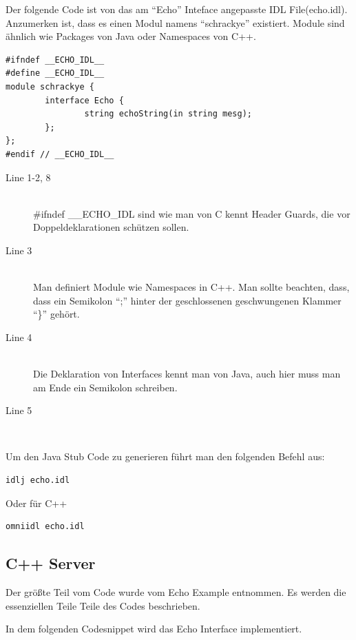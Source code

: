 \documentclass[11pt]{article}
\begin{document}
Der folgende Code ist von das am ``Echo'' Inteface angepasste IDL File(echo.idl). Anzumerken ist, dass es einen Modul namens ``schrackye'' existiert. Module sind ähnlich wie Packages von Java oder Namespaces von C++. 

\lstset{language=IDL}  

\begin{lstlisting}
#ifndef __ECHO_IDL__
#define __ECHO_IDL__
module schrackye {
        interface Echo {
                string echoString(in string mesg);
        };
};
#endif // __ECHO_IDL__         

\end{lstlisting}

\begin{description}
\item[Line 1-2, 8] \hfill \\
\#ifndef \_\_ECHO\_IDL sind wie man von C kennt Header Guards, die vor Doppeldeklarationen schützen sollen. 
\item[Line 3] \hfill \\
Man definiert Module wie Namespaces in C++. Man sollte beachten, dass, dass ein Semikolon ``;'' hinter der geschlossenen geschwungenen Klammer ``\}'' gehört.
\item[Line 4] \hfill \\
Die Deklaration von Interfaces kennt man von Java, auch hier muss man am Ende ein Semikolon schreiben.
\item[Line 5] \hfill \\


\end{description}
Um den Java Stub Code zu generieren führt man den folgenden Befehl aus:

\lstset{language=bash}
\begin{lstlisting}
idlj echo.idl
\end{lstlisting}
Oder für C++
\begin{lstlisting}
omniidl echo.idl
\end{lstlisting}

\subsection{C++ Server}

Der größte Teil vom Code wurde vom Echo Example entnommen. Es werden die essenziellen Teile Teile des Codes beschrieben. 

In dem folgenden Codesnippet wird das Echo Interface implementiert.
\end{document}
